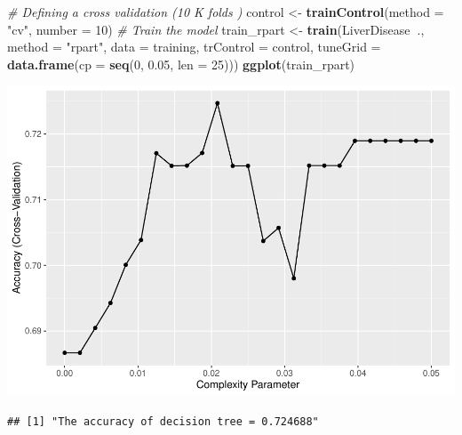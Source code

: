 \documentclass[]{article}
\newenvironment{Shaded}{\begin{snugshade}}{\end{snugshade}}
\newcommand{\CommentTok}[1]{\textcolor[rgb]{0.56,0.35,0.01}{\textit{#1}}}
\newcommand{\DataTypeTok}[1]{\textcolor[rgb]{0.13,0.29,0.53}{#1}}
\newcommand{\DecValTok}[1]{\textcolor[rgb]{0.00,0.00,0.81}{#1}}
\newcommand{\FloatTok}[1]{\textcolor[rgb]{0.00,0.00,0.81}{#1}}
\newcommand{\KeywordTok}[1]{\textcolor[rgb]{0.13,0.29,0.53}{\textbf{#1}}}
\newcommand{\NormalTok}[1]{#1}
\newcommand{\OperatorTok}[1]{\textcolor[rgb]{0.81,0.36,0.00}{\textbf{#1}}}
\newcommand{\StringTok}[1]{\textcolor[rgb]{0.31,0.60,0.02}{#1}}
\begin{document}
\begin{Shaded}
\begin{Highlighting}[]
\CommentTok{# Defining a cross validation (10 K folds )}
\NormalTok{control <-}\StringTok{ }\KeywordTok{trainControl}\NormalTok{(}\DataTypeTok{method =} \StringTok{"cv"}\NormalTok{, }\DataTypeTok{number =} \DecValTok{10}\NormalTok{)}
\CommentTok{# Train the model}
\NormalTok{train_rpart <-}\StringTok{ }\KeywordTok{train}\NormalTok{(LiverDisease}\OperatorTok{~}\NormalTok{., }
                     \DataTypeTok{method =} \StringTok{"rpart"}\NormalTok{,}
                     \DataTypeTok{data =}\NormalTok{ training,}
                     \DataTypeTok{trControl =}\NormalTok{ control,}
                     \DataTypeTok{tuneGrid =} \KeywordTok{data.frame}\NormalTok{(}\DataTypeTok{cp =} \KeywordTok{seq}\NormalTok{(}\DecValTok{0}\NormalTok{, }\FloatTok{0.05}\NormalTok{, }\DataTypeTok{len =} \DecValTok{25}\NormalTok{)))}
\KeywordTok{ggplot}\NormalTok{(train_rpart)}
\end{Highlighting}
\end{Shaded}

\includegraphics{LiverDisease_files/figure-latex/unnamed-chunk-28-1.pdf}

\begin{Shaded}
\end{Shaded}

\begin{verbatim}
## [1] "The accuracy of decision tree = 0.724688"
\end{verbatim}
\end{document}
